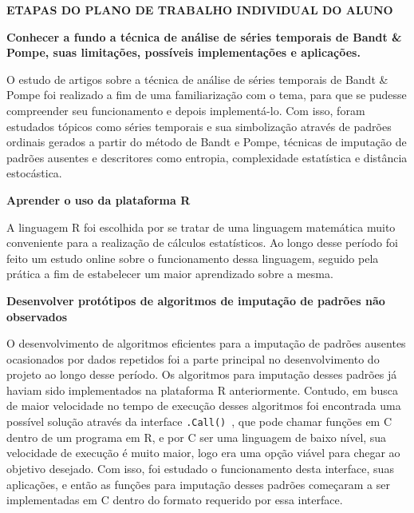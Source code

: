 \documentclass{article}
\begin{document}
\newpage
\begin{center}
\textbf{\large{ETAPAS DO PLANO DE TRABALHO INDIVIDUAL DO ALUNO}}

\hrulefill 

\end{center}

\begin{flushleft}    
\textbf{Conhecer a fundo a técnica de análise de séries temporais de Bandt \& Pompe, suas limitações, possíveis implementações e aplicações.}
\end{flushleft}

O estudo de artigos sobre a técnica de análise de séries temporais de Bandt \& Pompe foi realizado a fim de uma familiarização com o tema, para que se pudesse compreender seu funcionamento e depois implementá-lo.
Com isso, foram estudados tópicos como séries temporais e sua simbolização através de padrões ordinais gerados a partir do método de Bandt e Pompe, técnicas de imputação de padrões ausentes e descritores como entropia, complexidade estatística e distância estocástica.


\begin{flushleft}
\textbf{Aprender o uso da plataforma R}
\end{flushleft}


A linguagem R foi escolhida por se tratar de uma linguagem matemática muito conveniente para a realização de cálculos estatísticos. Ao longo desse período foi feito um estudo online sobre o funcionamento dessa linguagem, seguido pela prática a fim de estabelecer um maior aprendizado sobre a mesma.\\


\begin{flushleft}
\textbf{Desenvolver protótipos de algoritmos de imputação de padrões não observados}
\end{flushleft}


O desenvolvimento de algoritmos eficientes para a imputação de padrões ausentes ocasionados por dados repetidos foi a parte principal no desenvolvimento do projeto ao longo desse período. 
Os algoritmos para imputação desses padrões já haviam sido implementados na plataforma R anteriormente. Contudo, em busca de maior velocidade no tempo de execução desses algoritmos foi encontrada uma possível solução através da interface \verb|.Call()|~\cite{Speed}, que pode chamar funções em C dentro de um programa em R, e por C ser uma linguagem de baixo nível, sua velocidade de execução é muito maior, logo era uma opção viável para chegar ao objetivo desejado.
Com isso, foi estudado o funcionamento desta interface, suas aplicações, e então as funções para imputação desses padrões começaram a ser implementadas em C dentro do formato requerido por essa interface.
\end{document}
